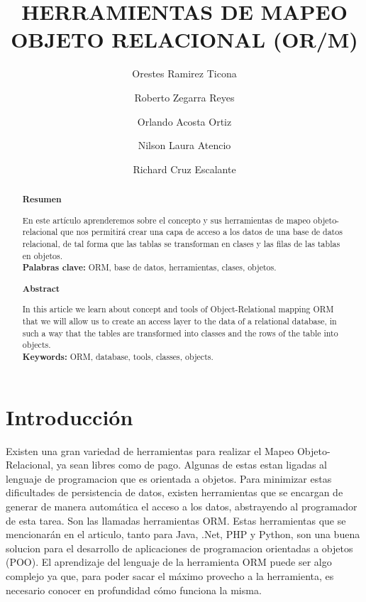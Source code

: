 \documentclass[%
 reprint,
 amsmath,amssymb,
 aps,
]{revtex4-1}
\begin{document}
\title{HERRAMIENTAS DE MAPEO OBJETO RELACIONAL (OR/M)}
\author{Orestes Ramirez Ticona }
\author{Roberto Zegarra Reyes }
\author{Orlando Acosta Ortiz }
\author{Nilson Laura Atencio }
\author{Richard Cruz Escalante }
%

\begin{abstract}
\begin{center}
\textbf{Resumen}
\end{center}
En este artículo aprenderemos sobre el concepto y sus herramientas de mapeo objeto-relacional que nos permitirá crear una capa de acceso a los datos de una base de datos relacional, de tal forma que las tablas se transforman en clases y las filas de las tablas en objetos.\\
\textbf{Palabras clave:}   ORM, base de datos, herramientas, clases, objetos.\\

\begin{center}
\textbf{Abstract}
\end{center}
In this article we learn about concept and tools of Object-Relational mapping ORM that we will allow us to create an access layer to the data of a relational database, in such a way that the tables are transformed into classes and the rows of the table into objects.\\
\textbf{Keywords:}   ORM, database, tools, classes, objects.

\end{abstract}



\maketitle


\section {Introducción}\label{sec:1}
Existen una gran variedad de herramientas para realizar el Mapeo Objeto-Relacional, ya sean libres como de pago. Algunas de estas estan ligadas al lenguaje de programacion que es orientada a objetos. Para minimizar estas dificultades de persistencia de datos, existen herramientas que se encargan de generar de manera automática el acceso a los datos, abstrayendo al programador de esta tarea. Son las llamadas herramientas ORM.
Estas herramientas que se mencionarán en el articulo, tanto para Java, .Net, PHP y Python, son una buena solucion para el desarrollo de aplicaciones de programacion orientadas a objetos (POO). 
El aprendizaje del lenguaje de la herramienta ORM puede ser algo complejo ya que, para poder sacar el máximo provecho a la herramienta, es necesario conocer en profundidad cómo funciona la misma.
\end{document}
